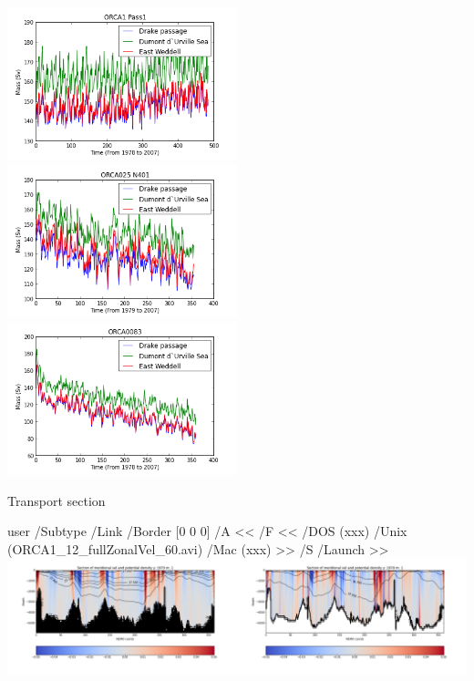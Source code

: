 \documentclass{beamer}
\newcommand{\LaunchBinary}[2]{%
  \leavevmode%
  \pdfstartlink user {
    /Subtype /Link
    /Border [0 0 0]%
    /A <<
      /F <<
         /DOS (xxx)
         /Unix (#1)
         /Mac (xxx)
      >>
      /S /Launch
    >>
  }#2%
  \pdfendlink%
}
\begin{document}
\begin{frame}
\center
\includegraphics[width=0.5\textwidth]{accMass_take2.png}\\
\includegraphics[width=0.5\textwidth]{accMassORCA025_N401.png}
\includegraphics[width=0.5\textwidth]{accMassORCA0083.png}
\end{frame}

\begin{frame}{Transport section}
\begin{center}
\LaunchBinary{ORCA1_12_fullZonalVel_60.avi}{\includegraphics[width=1\textwidth]{mergedORCA12_fullZonalVel_60_t000.png}}%
\end{center}
\end{frame}
\end{document}
